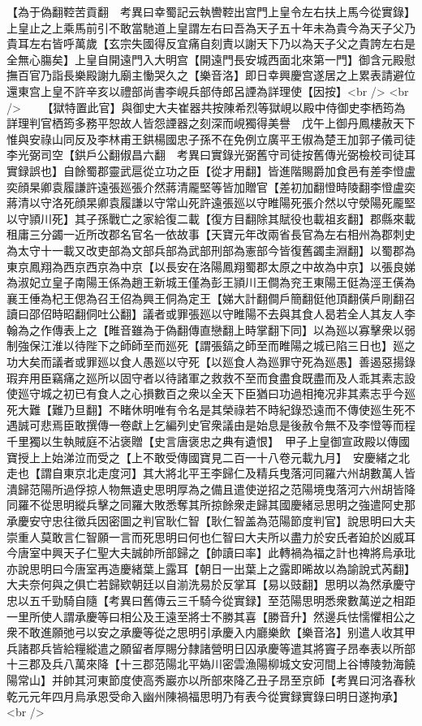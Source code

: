 【為于偽翻鞚苦貢翻　考異曰幸蜀記云執轡鞚出宫門上皇令左右扶上馬今從實錄】上皇止之上乘馬前引不敢當馳道上皇謂左右曰吾為天子五十年未為貴今為天子父乃貴耳左右皆呼萬歲【玄宗失國得反宜痛自刻責以謝天下乃以為天子父之貴誇左右是全無心膓矣】上皇自開遠門入大明宫【開遠門長安城西面北來第一門】御含元殿慰撫百官乃詣長樂殿謝九廟主慟哭久之【樂音洛】即日幸興慶宫遂居之上累表請避位還東宫上皇不許辛亥以禮部尚書李峴兵部侍郎呂諲為詳理使【因按】<br />
<br />
　　【獄特置此官】與御史大夫崔器共按陳希烈等獄峴以殿中侍御史李栖筠為詳理判官栖筠多務平恕故人皆怨諲器之刻深而峴獨得美譽　戊午上御丹鳳樓赦天下惟與安祿山同反及李林甫王鉷楊國忠子孫不在免例立廣平王俶為楚王加郭子儀司徒李光弼司空【鉷戶公翻俶昌六翻　考異曰實錄光弼舊守司徒按舊傳光弼檢校司徒耳實録誤也】自餘蜀郡靈武扈從立功之臣【從才用翻】皆進階賜爵加食邑有差李憕盧奕顔杲卿袁履謙許遠張廵張介然蔣清龎堅等皆加贈官【差初加翻憕時陵翻李憕盧奕蔣清以守洛死顔杲卿袁履謙以守常山死許遠張廵以守睢陽死張介然以守滎陽死龎堅以守頴川死】其子孫戰亡之家給復二載【復方目翻除其賦役也載祖亥翻】郡縣來載租庸三分蠲一近所改郡名官名一依故事【天寶元年改兩省長官為左右相州為郡刺史為太守十一載又改吏部為文部兵部為武部刑部為憲部今皆復舊蠲圭淵翻】以蜀郡為東京鳳翔為西京西京為中京【以長安在洛陽鳳翔蜀郡太原之中故為中京】以張良娣為淑妃立皇子南陽王係為趙王新城王僅為彭王頴川王僴為兖王東陽王侹為涇王僙為襄王倕為杞王偲為召王佋為興王侗為定王【娣大計翻僴戶簡翻侹他頂翻僙戶剛翻召讀曰邵佋時昭翻侗吐公翻】議者或罪張廵以守睢陽不去與其食人曷若全人其友人李翰為之作傳表上之【睢音雖為于偽翻傳直戀翻上時掌翻下同】以為廵以寡擊衆以弱制強保江淮以待陛下之師師至而廵死【謂張鎬之師至而睢陽之城已陷三日也】廵之功大矣而議者或罪廵以食人愚廵以守死【以廵食人為廵罪守死為廵愚】善遏惡揚錄瑕弃用臣竊痛之廵所以固守者以待諸軍之救救不至而食盡食既盡而及人乖其素志設使廵守城之初已有食人之心損數百之衆以全天下臣猶曰功過相掩况非其素志乎今廵死大難【難乃旦翻】不睹休明唯有令名是其榮祿若不時紀錄恐遠而不傳使廵生死不遇誠可悲焉臣敢撰傳一卷獻上乞編列史官衆議由是始息是後赦令無不及李憕等而程千里獨以生執賊庭不沾褒贈【史言唐褒忠之典有遺恨】　甲子上皇御宣政殿以傳國寶授上上始涕泣而受之【上不敢受傳國寶見二百一十八卷元載九月】　安慶緒之北走也【謂自東京北走度河】其大將北平王李歸仁及精兵曳落河同羅六州胡數萬人皆潰歸范陽所過俘掠人物無遺史思明厚為之備且遣使逆招之范陽境曳落河六州胡皆降同羅不從思明縱兵擊之同羅大敗悉奪其所掠餘衆走歸其國慶緒忌思明之強遣阿史那承慶安守忠往徵兵因密圖之判官耿仁智【耿仁智盖為范陽節度判官】說思明曰大夫崇重人莫敢言仁智願一言而死思明曰何也仁智曰大夫所以盡力於安氏者廹於凶威耳今唐室中興天子仁聖大夫誠帥所部歸之【帥讀曰率】此轉禍為福之計也禆將烏承玭亦說思明曰今唐室再造慶緒葉上露耳【朝日一出葉上之露即晞故以為諭說式芮翻】大夫奈何與之俱亡若歸欵朝廷以自湔洗易於反掌耳【易以豉翻】思明以為然承慶守忠以五千勁騎自隨【考異曰舊傳云三千騎今從實録】至范陽思明悉衆數萬逆之相距一里所使人謂承慶等曰相公及王遠至將士不勝其喜【勝音升】然邊兵怯懦懼相公之衆不敢進願弛弓以安之承慶等從之思明引承慶入内廳樂飲【樂音洛】别遣人收其甲兵諸郡兵皆給糧縱遣之願留者厚賜分隸諸營明日囚承慶等遣其將竇子昂奉表以所部十三郡及兵八萬來降【十三郡范陽北平媯川密雲漁陽柳城文安河間上谷博陵勃海饒陽常山】并帥其河東節度使高秀巖亦以所部來降乙丑子昂至京師【考異曰河洛春秋乾元元年四月烏承恩受命入幽州陳禍福思明乃有表今從實録實錄曰明日遂拘承】<br />
